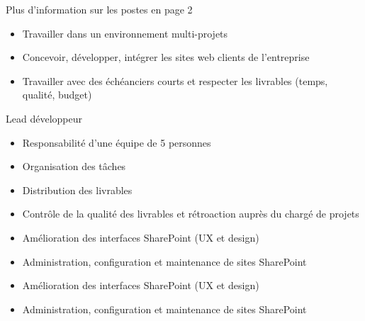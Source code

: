 \documentclass[10pt,a4paper]{altacv}
\begin{document}
\tiny \hypertarget{page2}{Plus d'information sur les postes en page 2}


\clearpage
{}

\begin{itemize}
\item Travailler dans un environnement multi-projets
\item Concevoir, développer, intégrer les sites web clients de l’entreprise
\item Travailler avec des échéanciers courts et respecter les livrables (temps, qualité, budget)

\end{itemize}

\begin{large}
Lead développeur
\end{large}
\begin{itemize}
\item Responsabilité d’une équipe de 5 personnes
\item Organisation des tâches
\item Distribution des livrables
\item Contrôle de la qualité des livrables et rétroaction auprès du chargé de projets
\end{itemize}

\divider

\begin{itemize}
\item Amélioration des interfaces SharePoint (UX et design)
\item Administration, configuration et maintenance de sites SharePoint
\end{itemize}

\divider

\begin{itemize}
\item Amélioration des interfaces SharePoint (UX et design)
\item Administration, configuration et maintenance de sites SharePoint
\end{itemize}
\end{document}
